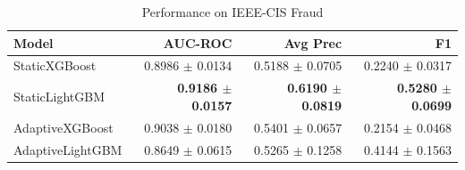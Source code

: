 \begin{table}[ht]
\centering
\caption{Performance on IEEE-CIS Fraud}
\label{tab:results_ieee_cis}
\begin{tabular}{lrrr}
\hline
Model & AUC-ROC & Avg Prec & F1 \\
\hline
StaticXGBoost & 0.8986 $\pm$ 0.0134 & 0.5188 $\pm$ 0.0705 & 0.2240 $\pm$ 0.0317 \\
StaticLightGBM & \textbf{0.9186 $\pm$ 0.0157} & \textbf{0.6190 $\pm$ 0.0819} & \textbf{0.5280 $\pm$ 0.0699} \\
AdaptiveXGBoost & 0.9038 $\pm$ 0.0180 & 0.5401 $\pm$ 0.0657 & 0.2154 $\pm$ 0.0468 \\
AdaptiveLightGBM & 0.8649 $\pm$ 0.0615 & 0.5265 $\pm$ 0.1258 & 0.4144 $\pm$ 0.1563 \\
\hline
\end{tabular}
\end{table}